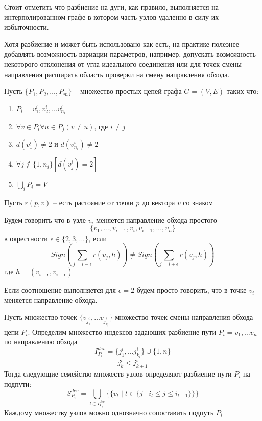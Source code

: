 \begin{remark}
Стоит отметить что разбиение на дуги, как правило, выполняется на интерполированном графе в котором часть узлов удаленно в силу их избыточности. 
\end{remark}

\begin{remark}
Хотя разбиение и может быть использовано как есть, на практике полезнее добавлять возможность вариации параметров, например, допускать возможность некоторого отклонения от угла идеального соединения или для точек смены направления расширять область проверки на смену направления обхода.
\end{remark}

Пусть $\{P_1, P_2, \dots, P_m\}$ -- множество простых цепей графа $G=(V,E)$ таких что:
\begin{enumerate}
\item $P_i = v^i_1, v^i_2, \dots v^i_{n_i}$
\item $\forall v\in P_i \forall u \in P_j(v\neq u)$, где $i\neq j$
\item $d(v^i_1)\neq 2$ и $d(v^i_{n_i})\neq 2$
\item $\forall j\notin\{1, n_i\}\left[d(v^i_j) = 2\right]$
\item $\bigcup_i P_i = V$
\end{enumerate}

\begin{definition}
Пусть $r(p,v)$ -- есть растояние от точки $p$ до вектора $v$ со знаком
\end{definition}


\begin{definition}
Будем говорить что в узле $v_i$ меняется направление обхода простого  
$$\{v_1,...,v_{i-1},v_i,v_{i+1},...,v_n\}$$
в окрестности $\epsilon\in \{2, 3, ...\}$, если
$$
Sign(\sum\limits_{j=i-\epsilon}{r(v_j,h)}) \neq Sign(\sum\limits_{j=i+\epsilon}{r(v_j,h)})
$$
где $h = (v_{i-\epsilon}, v_{i+\epsilon})$

Если соотношение выполняется для $\epsilon=2$ будем просто говорить, что в точке $v_i$ меняется направление обхода.
\end{definition}

Пусть множество точек  $\{ v_{j^i_{1}}, \dots v_{j^i_{k_i}} \}$ множество точек смены направления обхода цепи $P_i$.
Определим множество индексов задающих разбиение пути $P_i = v_1, \dots v_n$ по направлению обхода
$$
I^{dev}_{P_i} = \{ j^i_{1}, \dots j^i_{k_i} \} \cup \{1, n\}
$$
$$
j^i_{k} < j^i_{k+1}
$$
Тогда следующие семейство множеств узлов определяют разбиение пути $P_i$ на подпути:
$$
S^{dev}_{P_i} = \bigcup_{l \in I^{dev}_{P_i}}
	\{
		\{ v_t\;|\;t\in \{j\;|\;i_l\leq j\leq i_{l+1}\}\}
	\}
$$
Каждому множеству узлов можно однозначно сопоставить подпуть $P_i$

